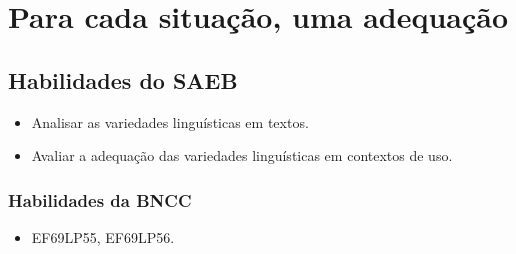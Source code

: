\chapter{Para cada situação, uma adequação}

\section*{Habilidades do SAEB }
\begin{itemize}
\item Analisar as variedades linguísticas em textos. 
\item Avaliar a adequação das variedades linguísticas em contextos de uso.
\end{itemize}

\subsection*{Habilidades da BNCC}
\begin{itemize}
\item EF69LP55, EF69LP56.
\end{itemize}

